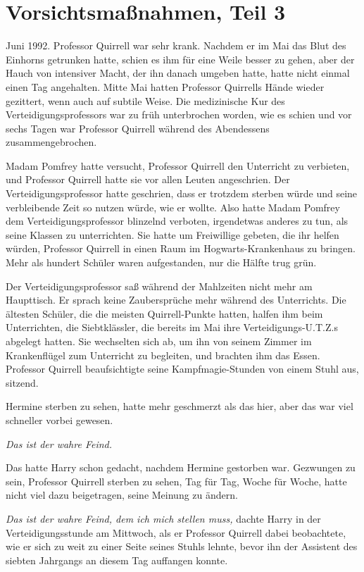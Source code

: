 \chapter{Vorsichtsmaßnahmen, Teil 3}

Juni 1992. Professor Quirrell war sehr krank. Nachdem er im Mai das Blut des
Einhorns getrunken hatte, schien es ihm für eine Weile besser zu gehen, aber der
Hauch von intensiver Macht, der ihn danach umgeben hatte, hatte nicht einmal
einen Tag angehalten. Mitte Mai hatten Professor Quirrells Hände wieder
gezittert, wenn auch auf subtile Weise. Die medizinische Kur des
Verteidigungsprofessors war zu früh unterbrochen worden, wie es schien und vor
sechs Tagen war Professor Quirrell während des Abendessens zusammengebrochen.

Madam Pomfrey hatte versucht, Professor Quirrell den Unterricht zu verbieten,
und Professor Quirrell hatte sie vor allen Leuten angeschrien. Der
Verteidigungsprofessor hatte geschrien, dass er trotzdem sterben würde und seine
verbleibende Zeit so nutzen würde, wie er wollte. Also hatte Madam Pomfrey dem
Verteidigungsprofessor blinzelnd verboten, irgendetwas anderes zu tun, als seine
Klassen zu unterrichten. Sie hatte um Freiwillige gebeten, die ihr helfen
würden, Professor Quirrell in einen Raum im Hogwarts-Krankenhaus zu bringen.
Mehr als hundert Schüler waren aufgestanden, nur die Hälfte trug grün.

Der Verteidigungsprofessor saß während der Mahlzeiten nicht mehr am Haupttisch.
Er sprach keine Zaubersprüche mehr während des Unterrichts. Die ältesten
Schüler, die die meisten Quirrell-Punkte hatten, halfen ihm beim Unterrichten,
die Siebtklässler, die bereits im Mai ihre Verteidigungs-U.T.Z.s abgelegt
hatten. Sie wechselten sich ab, um ihn von seinem Zimmer im Krankenflügel zum
Unterricht zu begleiten, und brachten ihm das Essen. Professor Quirrell
beaufsichtigte seine Kampfmagie-Stunden von einem Stuhl aus, sitzend.

Hermine sterben zu sehen, hatte mehr geschmerzt als das hier, aber das war viel
schneller vorbei gewesen.

\emph{Das ist der wahre Feind.}

Das hatte Harry schon gedacht, nachdem Hermine gestorben war. Gezwungen zu sein,
Professor Quirrell sterben zu sehen, Tag für Tag, Woche für Woche, hatte nicht
viel dazu beigetragen, seine Meinung zu ändern.

\emph{Das ist der wahre Feind, dem ich mich stellen muss,} dachte Harry in der
Verteidigungsstunde am Mittwoch, als er Professor Quirrell dabei beobachtete,
wie er sich zu weit zu einer Seite seines Stuhls lehnte, bevor ihn der Assistent
des siebten Jahrgangs an diesem Tag auffangen konnte.

